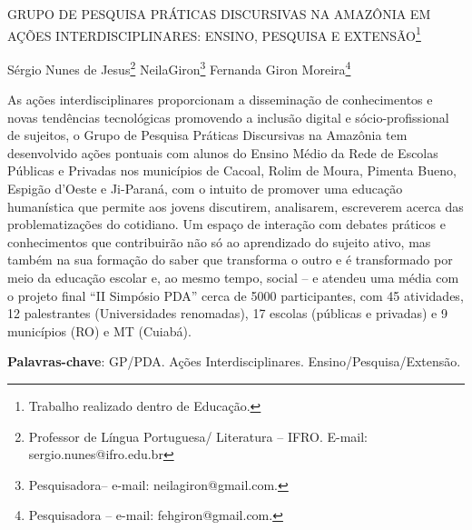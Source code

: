 \documentclass[article,12pt,onesidea,4paper,english,brazil]{abntex2}
\begin{document}
	
	
	\frenchspacing 
	
	\begin{center}
		\LARGE GRUPO DE PESQUISA PRÁTICAS DISCURSIVAS NA AMAZÔNIA EM AÇÕES INTERDISCIPLINARES: ENSINO, PESQUISA E EXTENSÃO\footnote{Trabalho realizado dentro de Educação.}
		
		\normalsize
		Sérgio Nunes de Jesus\footnote{Professor de Língua Portuguesa/ Literatura – IFRO. E-mail: sergio.nunes@ifro.edu.br} 
		NeilaGiron\footnote{Pesquisadora– e-mail: neilagiron@gmail.com.} 
		Fernanda Giron Moreira\footnote{Pesquisadora – e-mail: fehgiron@gmail.com.} 
	\end{center}
	
	\noindent As ações interdisciplinares proporcionam a disseminação de conhecimentos e novas tendências tecnológicas promovendo a inclusão digital e sócio-profissional de sujeitos, o Grupo de Pesquisa Práticas Discursivas na Amazônia tem desenvolvido ações pontuais com alunos do Ensino Médio da Rede de Escolas Públicas e Privadas nos municípios de Cacoal, Rolim de Moura, Pimenta Bueno, Espigão d’Oeste e Ji-Paraná, com o intuito de promover uma educação humanística que permite aos jovens discutirem, analisarem, escreverem acerca das problematizações do cotidiano. Um espaço de interação com debates práticos e conhecimentos que contribuirão não só ao aprendizado do sujeito ativo, mas também na sua formação do saber que transforma o outro e é transformado por meio da educação escolar e, ao mesmo tempo, social – e atendeu uma média com o projeto final “II Simpósio PDA” cerca de 5000 participantes, com 45 atividades, 12 palestrantes (Universidades renomadas), 17 escolas (públicas e privadas) e 9 municípios (RO) e MT (Cuiabá).
	
	\vspace{\onelineskip}
	
	\noindent
	\textbf{Palavras-chave}: GP/PDA. Ações Interdisciplinares. Ensino/Pesquisa/Extensão.
	
\end{document}
